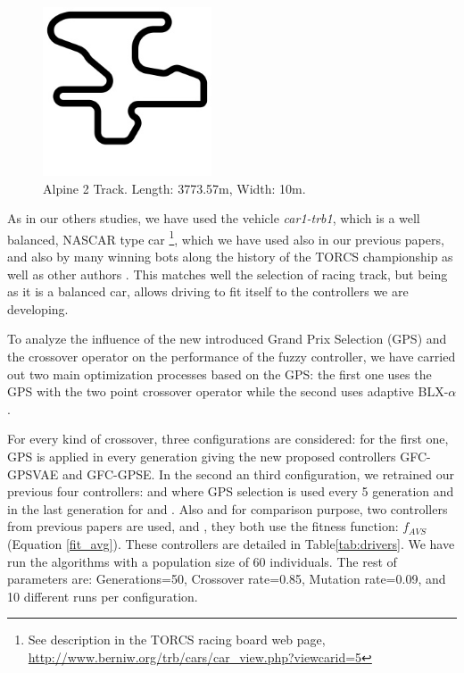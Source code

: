\documentclass[10pt,journal,compsoc]{IEEEtran}
\begin{document}
\begin{figure}[!ht]	
	\begin{center}
		\includegraphics[width=5cm]{fig/alpine2.jpg}
		\caption{Alpine 2 Track. Length: 3773.57m, Width: 10m.}
		\label{fig:alpine2_track}	
	\end{center}	
\end{figure}

As in our others studies, we have used the vehicle \textit{car1-trb1},
which is a well balanced, NASCAR type car \footnote{See description in
  the TORCS racing board web page,
  \url{http://www.berniw.org/trb/cars/car_view.php?viewcarid=5}},
which we have used also in our previous papers, and also by many
winning bots along the history of the TORCS championship
\cite{torcs5} as well as other authors
\cite{auteur2010,li2019reinforcement}. This matches well the selection
of racing track, but being as it is a balanced car, allows driving to
fit itself to the controllers we are developing.




To analyze the influence of the new introduced Grand Prix Selection
(GPS) and the crossover operator on the performance of the fuzzy
controller, we have carried out  two main optimization processes based
on the GPS: the first one uses the GPS with the two point crossover
operator while the second uses   adaptive BLX-$\alpha$.

For every kind of crossover, three configurations are considered: for
the first one, GPS is applied in every generation giving the new
proposed controllers {\sf GFC-GPSVAE} and
{\sf GFC-GPSE}. In the second an third configuration, we retrained our previous four  controllers\cite{DBLP:conf/cig/SalemMG19}: {} and 
{} where GPS selection is used every 5 generation and in the last generation for  {} and 
{}.
Also  and for comparison purpose, two controllers from previous papers are used, {}\cite{DBLP:conf/cig/SalemMG19} and {}\cite{salem_cig2018}, they both use the fitness function: $f_{AVS}$ (Equation \ref{fit_avg}).
These controllers are detailed in Table\ref{tab:drivers}. 
We have run the algorithms with a population size of 60
individuals. The rest of parameters are: Generations=50, Crossover
rate=0.85, Mutation rate=0.09, and 10 different runs per
configuration. %
\end{document}
